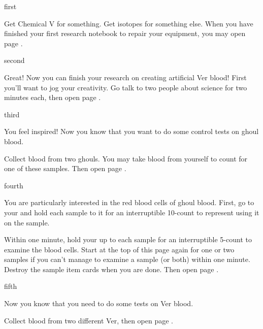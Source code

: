 \documentclass[greennotebook]{guildcamp4} %
\begin{document}
\startnotebook{\nSpiteNotebook{}}

\begin{page}{first}

Get Chemical V for something. Get isotopes for something else.
When you have finished your first research notebook to repair your equipment, you may open page .

\end{page}

\begin{page}{second}

Great! Now you can finish your research on creating artificial Ver blood! First you'll want to jog your creativity. Go talk to two people about science for two minutes each, then open page .

\end{page}

\begin{page}{third}

You feel inspired! Now you know that you want to do some control tests on ghoul blood.

Collect blood from two ghouls. You may take blood from yourself to count for one of these samples. Then open page .

\end{page}

\begin{page}{fourth}

You are particularly interested in the red blood cells of ghoul blood. First, go to your \sCentrifuge{} and hold each sample to it for an interruptible 10-count to represent using it on the sample.

Within one minute, hold your \iMicroscope{} up to each sample for an interruptible 5-count to examine the blood cells. Start  at the top of this page again for one or two samples if you can't manage to examine a sample (or both) within one minute. Destroy the sample item cards when you are done. Then open page .

\end{page}

\begin{page}{fifth}

Now you know that you need to do some tests on Ver blood.

Collect blood from two different Ver, then open page .

\end{page}
\end{document}
